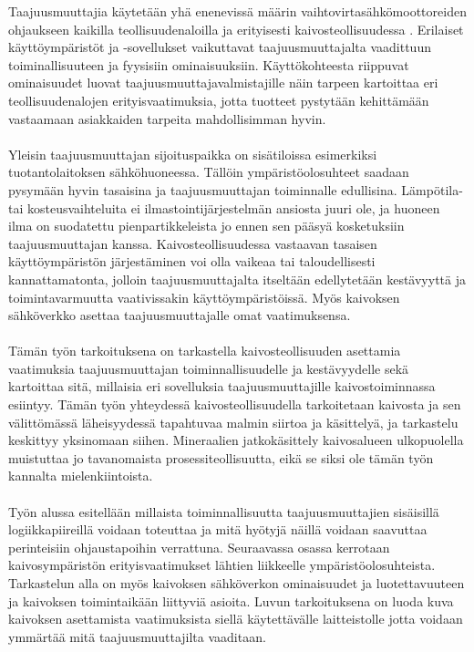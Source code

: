 \documentclass[finnish,12pt,a4paper,pdftex,elec,utf8]{aaltothesis}
\begin{document}
\thispagestyle{empty}
Taajuusmuuttajia käytetään yhä enenevissä määrin vaihtovirtasähkömoottoreiden ohjaukseen kaikilla teollisuudenaloilla ja erityisesti kaivosteollisuudessa \cite[s. 262]{Hakapää}. %
Erilaiset käyttöympäristöt ja -sovellukset vaikuttavat taajuusmuuttajalta vaadittuun toiminallisuuteen ja fyysisiin ominaisuuksiin. Käyttökohteesta riippuvat ominaisuudet luovat taajuusmuuttajavalmistajille näin tarpeen kartoittaa eri teollisuudenalojen erityisvaatimuksia, jotta tuotteet pystytään kehittämään vastaamaan asiakkaiden tarpeita mahdollisimman hyvin. 
\\\\
Yleisin taajuusmuuttajan sijoituspaikka on sisätiloissa esimerkiksi tuotantolaitoksen sähköhuoneessa. Tällöin ympäristöolosuhteet saadaan pysymään hyvin tasaisina ja taajuusmuuttajan toiminnalle edullisina. Lämpötila- tai kosteusvaihteluita ei ilmastointijärjestelmän ansiosta juuri ole, ja huoneen ilma on suodatettu pienpartikkeleista jo ennen sen pääsyä kosketuksiin taajuusmuuttajan kanssa. Kaivosteollisuudessa vastaavan tasaisen käyttöympäristön järjestäminen voi olla vaikeaa tai taloudellisesti kannattamatonta, jolloin taajuusmuuttajalta itseltään edellytetään kestävyyttä ja toimintavarmuutta vaativissakin käyttöympäristöissä. Myös kaivoksen sähköverkko asettaa taajuusmuuttajalle omat vaatimuksensa.
\\\\
Tämän työn tarkoituksena on tarkastella kaivosteollisuuden asettamia vaatimuksia taajuusmuuttajan toiminnallisuudelle ja kestävyydelle sekä kartoittaa sitä, millaisia eri sovelluksia taajuusmuuttajille kaivostoiminnassa esiintyy. Tämän työn yhteydessä kaivosteollisuudella tarkoitetaan kaivosta ja sen välittömässä läheisyydessä tapahtuvaa malmin siirtoa ja käsittelyä, ja tarkastelu keskittyy yksinomaan siihen. Mineraalien jatkokäsittely kaivosalueen ulkopuolella muistuttaa jo tavanomaista prosessiteollisuutta, eikä se siksi ole tämän työn kannalta mielenkiintoista.
\\\\
Työn alussa esitellään millaista toiminnallisuutta taajuusmuuttajien sisäisillä logiikkapiireillä voidaan toteuttaa ja mitä hyötyjä näillä voidaan saavuttaa perinteisiin ohjaustapoihin verrattuna. Seuraavassa osassa kerrotaan kaivosympäristön erityisvaatimukset lähtien liikkeelle ympäristöolosuhteista. Tarkastelun alla on myös kaivoksen sähköverkon ominaisuudet ja luotettavuuteen ja kaivoksen toimintaikään liittyviä asioita. Luvun tarkoituksena on luoda kuva kaivoksen asettamista vaatimuksista siellä käytettävälle laitteistolle jotta voidaan ymmärtää mitä taajuusmuuttajilta vaaditaan.
\end{document}
